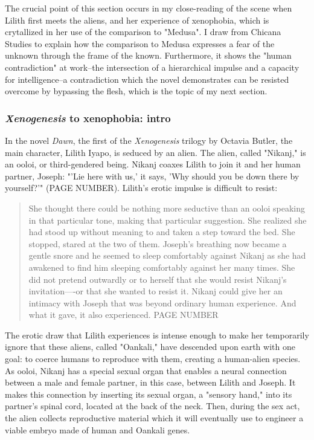 \documentclass[11pt]{article}
\begin{document}
The crucial point of this section occurs in my close-reading of the
scene when Lilith first meets the aliens, and her experience of
xenophobia, which is crytallized in her use of the comparison to
"Medusa". I draw from Chicana Studies to explain how the comparison to
Medusa expresses a fear of the unknown through the frame of the
known. Furthermore, it shows the "human contradiction" at work--the
intersection of a hierarchical impulse and a capacity for
intelligence--a contradiction which the novel demonstrates can be
resisted overcome by bypassing the flesh, which is the topic of my
next section.

\subsubsection{\emph{Xenogenesis} to xenophobia: intro}
\label{sec:org0d0671e}
In the novel \emph{Dawn}, the first of the \emph{Xenogenesis} trilogy by Octavia
Butler, the main character, Lilith Iyapo, is seduced by an alien. The
alien, called "Nikanj," is an ooloi, or third-gendered being. Nikanj
coaxes Lilith to join it and her human partner, Joseph: "'Lie here
with us,' it says, 'Why should you be down there by yourself?'" (PAGE
NUMBER). Lilith's erotic impulse is difficult to resist:
\begin{quote}
She thought there could be nothing more seductive than an ooloi
speaking in that particular tone, making that particular
suggestion. She realized she had stood up without meaning to and taken
a step toward the bed. She stopped, stared at the two of
them. Joseph’s breathing now became a gentle snore and he seemed to
sleep comfortably against Nikanj as she had awakened to find him
sleeping comfortably against her many times. She did not pretend
outwardly or to herself that she would resist Nikanj’s invitation—-or
that she wanted to resist it. Nikanj could give her an intimacy with
Joseph that was beyond ordinary human experience. And what it gave, it
also experienced. PAGE NUMBER
\end{quote}
The erotic draw that Lilith experiences is intense enough to make her
temporarily ignore that these aliens, called "Oankali," have descended
upon earth with one goal: to coerce humans to reproduce with them,
creating a human-alien species. As ooloi, Nikanj has a special sexual
organ that enables a neural connection between a male and female
partner, in this case, between Lilith and Joseph. It makes this
connection by inserting its sexual organ, a "sensory hand," into its
partner's spinal cord, located at the back of the neck. Then, during
the sex act, the alien collects reproductive material which it will
eventually use to engineer a viable embryo made of human and Oankali
genes.
\end{document}
